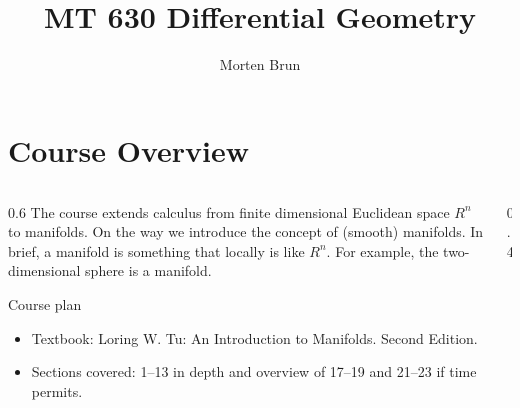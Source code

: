 

\title{MT 630 Differential Geometry}
\author{Morten Brun}



\begin{frame}
  \titlepage
\end{frame}


\section{Course Overview}

\begin{frame}
\begin{columns}
  \begin{column}
    {0.6\textwidth}
    The course extends calculus from finite dimensional Euclidean space $R^n$ 
    to manifolds. On the way we introduce the concept of (smooth) manifolds.
    In brief, a manifold is something that locally is like $R^n$. For example, 
    the two-dimensional sphere is a manifold.
    \begin{block}
      {Course plan}
    \begin{itemize}
      \item Textbook: Loring W. Tu: An Introduction to Manifolds. Second Edition.
      \item Sections covered: 1--13 in depth and overview of 17--19 and 21--23 if time permits.
    \end{itemize}
    \end{block}
  \end{column}
  \begin{column}
    {0.4\textwidth}
  \end{column}
\end{columns}

\end{frame}


